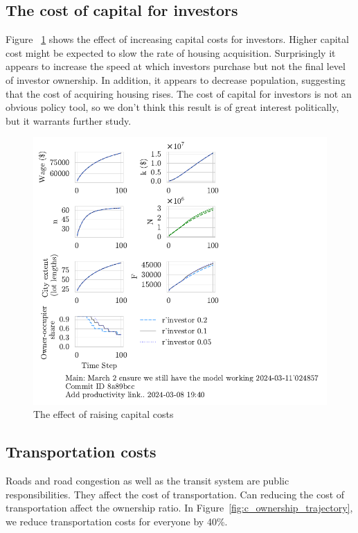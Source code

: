 \subsection{The cost of capital for investors}
Figure ~\ref{fig:capital_ownership_trajectory} shows the effect of increasing capital costs for investors. Higher capital cost might be expected to slow the rate of housing acquisition. Surprisingly it appears to increase the speed at which investors purchase but not the final level of investor ownership.  In addition, it appears to decrease population, suggesting that the cost of acquiring housing rises. The cost of capital for investors is not an obvious policy tool, so we don't think this result is of great interest politically, but it warrants further study.
\begin{figure}[h!t]
    \centering
    \includegraphics[scale=.8, trim={0 1.4cm 0 0},clip]{fig/r_investor-Main-024857.pdf}
    \caption{The effect of raising capital costs}
    \label{fig:capital_ownership_trajectory}
\end{figure}

\newpage
\subsection{Transportation costs}
Roads and road congestion as well as the transit system are public responsibilities. They affect the cost of transportation. Can reducing the cost of transportation affect the ownership ratio. In Figure~\ref{fig:c_ownership_trajectory}, we reduce transportation costs for everyone by 40\%. 

